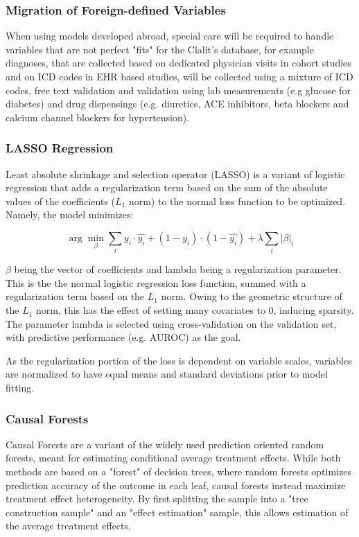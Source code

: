 \documentclass[a4paper,12pt]{article}
\begin{document}
		\subsubsection{Migration of Foreign-defined Variables}
		When using models developed abroad, special care will be required to handle variables that are not perfect "fits" for the Clalit's database, for example diagnoses, that are collected based on dedicated physician visits in cohort studies and on ICD codes in EHR based studies, will be collected using a mixture of ICD codes, free text validation and validation using lab measurements (e.g glucose for diabetes) and drug dispensings (e.g. diuretics, ACE inhibitors, beta blockers and calcium channel blockers for hypertension).
	
		\subsubsection{LASSO Regression}
		Least absolute shrinkage and selection operator (LASSO)\cite{Tibshirani2011} is a variant of logistic regression that adds a regularization term based on the sum of the absolute values of the coefficients ($ L_1 $ norm) to the normal loss function to be optimized. Namely, the model minimizes:
		
		\begin{equation*}
		\arg \min_\beta \sum_i y_i \cdot \hat{y_i} + (1- y_i) \cdot (1 - \hat{y_i}) + \lambda \sum_{i}|\beta|_i
		\end{equation*}
		
		$ \beta $ being the vector of coefficients and lambda being a regularization parameter. This is the the normal logistic regression loss function, summed with a regularization term based on the $ L_1 $ norm. Owing to the geometric structure of the $ L_1 $ norm, this has the effect of setting many covariates to 0, inducing sparsity. The parameter lambda is selected using cross-validation on the validation set, with predictive performance (e.g. AUROC) as the goal.
		
		As the regularization portion of the loss is dependent on variable scales, variables are normalized to have equal means and standard deviations prior to model fitting.
		
		\subsubsection{Causal Forests}
		Causal Forests\cite{Wager2015} are a variant of the widely used prediction oriented random forests\cite{Breiman2001}, meant for estimating conditional average treatment effects. While both methods are based on a "forest" of decision trees, where random forests optimizes prediction accuracy of the outcome in each leaf, causal forests instead maximize treatment effect heterogeneity. By first splitting the sample into a "tree construction sample" and an "effect estimation" sample, this allows estimation of the average treatment effects.
		
\end{document}
